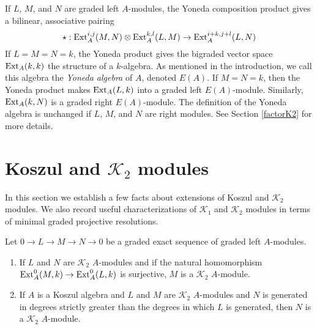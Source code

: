\documentclass[11pt,righttag]{amsart}
\begin{document}
If $L$, $M$, and $N$ are graded left $A$-modules, the Yoneda composition product gives a bilinear, associative pairing $$\star:{\hbox{{\rm Ext}}}_A^{i,j}(M,N)\otimes {\hbox{{\rm Ext}}}_A^{k,l}(L,M)\rightarrow {\hbox{{\rm Ext}}}_A^{i+k, j+l}(L,N)$$
If $L=M=N=k$, the Yoneda product gives the bigraded vector space ${\hbox{{\rm Ext}}}_A(k,k)$ the structure of a $k$-algebra. As mentioned in the introduction, we call this algebra the \emph{Yoneda algebra} of $A$, denoted $E(A)$. If $M=N=k$, then the Yoneda product makes ${\hbox{{\rm Ext}}}_A(L,k)$ into a graded left $E(A)$-module. Similarly, ${\hbox{{\rm Ext}}}_A(k,N)$ is a graded right $E(A)$-module.
The definition of the Yoneda algebra is unchanged if $L$, $M$, and $N$ are right modules. See Section \ref{factorK2} for more details. 

\section{Koszul and ${{\mathcal K}}_2$ modules} 
\label{modules}

In this section we establish a few facts about extensions of Koszul and ${{\mathcal K}}_2$ modules. We also record useful characterizations of ${{\mathcal K}}_1$ and ${{\mathcal K}}_2$ modules in terms of minimal graded projective resolutions.

\begin{lemma}
\label{K2Extensions}
Let $0\rightarrow L\rightarrow M\rightarrow N\rightarrow 0$ be a graded exact sequence of graded left $A$-modules.
\begin{enumerate}
\item If  $L$ and $N$ are ${{\mathcal K}}_2$ $A$-modules and if the natural homomorphism ${{\hbox{{\rm Ext}}}_A^0(M,k)\rightarrow {\hbox{{\rm Ext}}}_A^0(L,k)}$ is surjective,  $M$ is a ${{\mathcal K}}_2$ $A$-module.
\item If  $A$ is a Koszul algebra and $L$ and $M$ are ${{\mathcal K}}_2$ $A$-modules and $N$ is generated in degrees strictly greater than the degrees in which $L$ is generated, then $N$ is a ${{\mathcal K}}_2$ $A$-module.
\end{enumerate}
\end{lemma}
\end{document}
